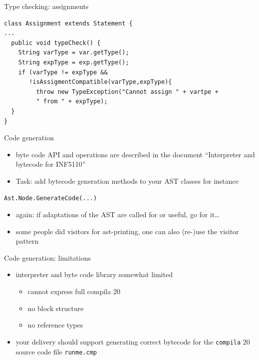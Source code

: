 \documentclass{beamer}
\begin{document}
\begin{frame}[label={sec:orgc375544},fragile,plain]{Type checking: assignments}
 \lstset{language=java,label= ,caption= ,captionpos=b,numbers=none}
\begin{lstlisting}
class Assignment extends Statement {
...
  public void typeCheck() {
    String varType = var.getType();
    String expType = exp.getType();
    if (varType != expType &&
       !isAssigmentCompatible(varType,expType){
		 throw new TypeException("Cannot assign " + vartpe + 
		 " from " + expType);
  }
}

\end{lstlisting}
\end{frame}



\begin{frame}[label={sec:org26ca86f},fragile]{Code generation}
 \begin{itemize}
\item byte code API and operations are described in the document ``Interpreter
and bytecode for INF5110''

\item \alert{Task:} add bytecode generation methods to your AST classes
for instance
\end{itemize}

\begin{verbatim}
Ast.Node.GenerateCode(...)
\end{verbatim}
\begin{itemize}
\item again: if adaptations of the AST are called for or useful, go for it\ldots{}

\item some people did visitors for ast-printing, one can also (re-)use the visitor pattern
\end{itemize}
\end{frame}

\begin{frame}[label={sec:org662b3ba},fragile]{Code generation: limitations}
 \begin{itemize}
\item interpreter and byte code library somewhat \alert{limited}
\begin{itemize}
\item cannot express full compila 20
\item no block structure
\item no reference types
\end{itemize}
\end{itemize}


\begin{itemize}
\item your delivery should support generating correct bytecode
for the \texttt{compila} 20 source code file \texttt{runme.cmp}
\end{itemize}
\end{frame}
\end{document}

